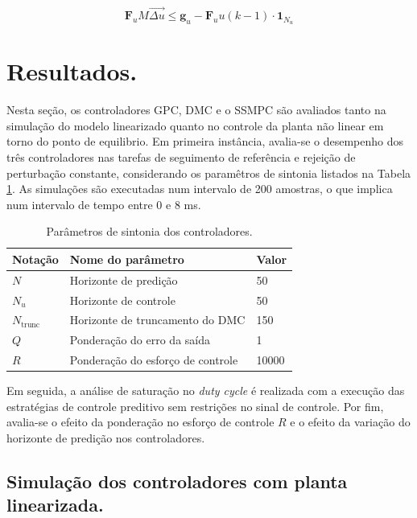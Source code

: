 \documentclass{article}
\begin{document}
\begin{equation}
  \mathbf{F}_u M \vec{\Delta u} \leq \mathbf{g}_u -\mathbf{F}_u u(k - 1)\cdot \mathbf{1}_{N_u}
  \label{eq:transf_restricao}
\end{equation}

\clearpage

\section{Resultados.}

Nesta seção, os controladores GPC, DMC e o SSMPC são avaliados tanto na simulação do modelo linearizado quanto no controle da planta não linear em torno do ponto de equilibrio. Em primeira instância, avalia-se o desempenho dos três controladores nas tarefas de seguimento de referência e rejeição de perturbação constante, considerando os paramêtros de sintonia listados na Tabela \ref{tab:sintonia_controladores}. As simulações são executadas num intervalo de 200 amostras, o que implica num intervalo de tempo entre 0 e 8 ms.


\begin{table}[h]
  \centering
  \caption{Parâmetros de sintonia dos controladores.}
  \label{tab:sintonia_controladores}
  \begin{tabular}{|l|l|l|}
    \hline
    Notação           & Nome do parâmetro                 & Valor \\ \hline
    \(N\)             & Horizonte de predição             & 50    \\ \hline
    \(N_u\)           & Horizonte de controle             & 50    \\ \hline
    \(N_\mathrm{trunc}\) & Horizonte de truncamento do DMC   & 150   \\ \hline
    \(Q\)             & Ponderação do erro da saída       & 1     \\ \hline
    \(R\)             & Ponderação do esforço de controle & 10000 \\ \hline
  \end{tabular}
\end{table}
Em seguida, a análise de saturação no \textit{duty cycle} é realizada com a execução das estratégias de controle preditivo sem restrições no sinal de controle. Por fim, avalia-se o efeito da ponderação no esforço de controle \(R\) e o efeito da variação do horizonte de predição nos controladores.

\subsection{Simulação dos controladores com planta linearizada.}
\end{document}
